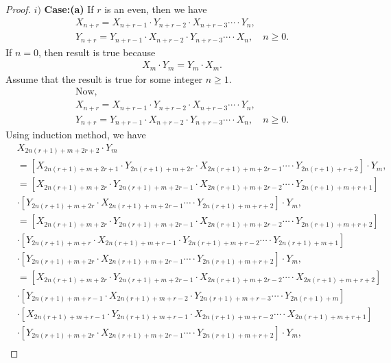\begin{proof}$i)$
\textbf{Case:(a)} If $r$ is an even, then we have
\begin{align*}
&	X_{n+r}=X_{n+r-1}\cdot Y_{n+r-2}\cdot X_{n+r-3}\cdots\cdot Y_{n},\\
	&Y_{n+r}=Y_{n+r-1}\cdot X_{n+r-2}\cdot Y_{n+r-3}\cdots\cdot X_{n},\quad n\geq 0.
		\end{align*}
		If $n=0$, then result is true because
\begin{align*}
&X_{m}\cdot Y_{m}=Y_{m}\cdot X_{m}.
	\end{align*}
	Assume that the result is true for some integer $n\geq1$.
\begin{align*}
&\text{Now,}\\
	&X_{n+r}=X_{n+r-1}\cdot Y_{n+r-2}\cdot X_{n+r-3}\cdots\cdot Y_{n},\\
	&Y_{n+r}=Y_{n+r-1}\cdot X_{n+r-2}\cdot Y_{n+r-3}\cdots\cdot X_{n},\quad n\geq 0.
	\end{align*}
	Using induction method, we have
\begin{align*}
&X_{2n(r+1)+m+2r+2}\cdot Y_{m}\\&=\left[X_{2n(r+1)+m+2r+1}\cdot Y_{2n(r+1)+m+2r}\cdot X_{2n(r+1)+m+2r-1}\cdots\cdot Y_{2n(r+1)+r+2}\right]\cdot Y_{m},\\
&=\left[X_{2n(r+1)+m+2r}\cdot Y_{2n(r+1)+m+2r-1}\cdot X_{2n(r+1)+m+2r-2}\cdots\cdot Y_{2n(r+1)+m+r+1}\right]\\
&\cdot\left[Y_{2n(r+1)+m+2r}\cdot X_{2n(r+1)+m+2r-1}\cdots\cdot Y_{2n(r+1)+m+r+2}\right]\cdot Y_{m},\\
&=\left[X_{2n(r+1)+m+2r}\cdot Y_{2n(r+1)+m+2r-1}\cdot X_{2n(r+1)+m+2r-2}\cdots\cdot Y_{2n(r+1)+m+r+2}\right]\\
&\cdot\left[Y_{2n(r+1)+m+r}\cdot X_{2n(r+1)+m+r-1}\cdot Y_{2n(r+1)+m+r-2}\cdots\cdot Y_{2n(r+1)+m+1}\right]\\
&\cdot\left[Y_{2n(r+1)+m+2r}\cdot X_{2n(r+1)+m+2r-1}\cdots\cdot Y_{2n(r+1)+m+r+2}\right]\cdot Y_{m},\\
&=\left[X_{2n(r+1)+m+2r}\cdot Y_{2n(r+1)+m+2r-1}\cdot X_{2n(r+1)+m+2r-2}\cdots\cdot X_{2n(r+1)+m+r+2}\right]\\
&\cdot\left[Y_{2n(r+1)+m+r-1}\cdot X_{2n(r+1)+m+r-2}\cdot Y_{2n(r+1)+m+r-3}\cdots\cdot Y_{2n(r+1)+m}\right]\\
&\cdot\left[X_{2n(r+1)+m+r-1}\cdot Y_{2n(r+1)+m+r-1}\cdot X_{2n(r+1)+m+r-2}\cdots\cdot X_{2n(r+1)+m+r+1}\right]\\&\cdot\left[Y_{2n(r+1)+m+2r}\cdot X_{2n(r+1)+m+2r-1}\cdots\cdot Y_{2n(r+1)+m+r+2}\right]\cdot Y_{m},\\

\end{align*}
\end{proof}
